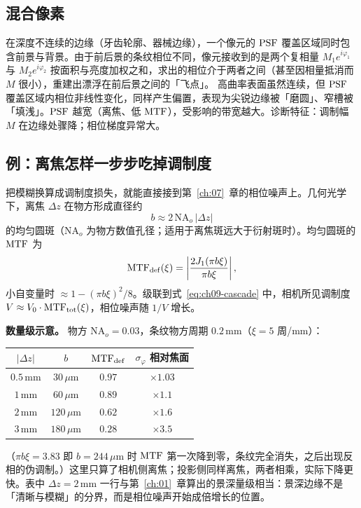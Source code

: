 \subsection{混合像素}

在深度不连续的边缘（牙齿轮廓、器械边缘），一个像元的 $\mathrm{PSF}$ 覆盖区域同时包含前景与背景。由于前后景的条纹相位不同，像元接收到的是两个复相量 $M_1e^{i\varphi_1}$ 与 $M_2e^{i\varphi_2}$ 按面积与亮度加权之和，求出的相位介于两者之间（甚至因相量抵消而 $M$ 很小），重建出漂浮在前后景之间的「飞点」。
高曲率表面虽然连续，但 $\mathrm{PSF}$ 覆盖区域内相位非线性变化，同样产生偏置，表现为尖锐边缘被「磨圆」、窄槽被「填浅」。$\mathrm{PSF}$ 越宽（离焦、低 $\mathrm{MTF}$），受影响的带宽越大。诊断特征：调制幅 $M$ 在边缘处骤降；相位梯度异常大。

\subsection{例：离焦怎样一步步吃掉调制度}

把模糊换算成调制度损失，就能直接接到第~\ref{ch:07}~章的相位噪声上。几何光学下，离焦 $\Delta z$ 在物方形成直径约
\[
  b\approx2\,\mathrm{NA}_o\,|\Delta z|
\]
的均匀圆斑（$\mathrm{NA}_o$ 为物方数值孔径；适用于离焦斑远大于衍射斑时）。均匀圆斑的 $\mathrm{MTF}$ 为
\[
  \mathrm{MTF}_{\mathrm{def}}(\xi)=\left|\frac{2J_1(\pi b\xi)}{\pi b\xi}\right|,
\]
小自变量时 $\approx1-(\pi b\xi)^2/8$。级联到式~\eqref{eq:ch09-cascade} 中，相机所见调制度 $V\approx V_0\cdot\mathrm{MTF}_{\mathrm{tot}}(\xi)$，相位噪声随 $1/V$ 增长。

\textbf{数量级示意。} 物方 $\mathrm{NA}_o=0.03$，条纹物方周期 $0.2\,\mathrm{mm}$（$\xi=5$ 周/mm）：
\begin{center}
\small
\begin{tabular}{cccc}
  \hline
  $|\Delta z|$ & $b$ & $\mathrm{MTF}_{\mathrm{def}}$ & $\sigma_\varphi$ 相对焦面\\
  \hline
  $0.5\,\mathrm{mm}$ & $30\,\mu\mathrm{m}$ & $0.97$ & $\times1.03$\\
  $1\,\mathrm{mm}$ & $60\,\mu\mathrm{m}$ & $0.89$ & $\times1.1$\\
  $2\,\mathrm{mm}$ & $120\,\mu\mathrm{m}$ & $0.62$ & $\times1.6$\\
  $3\,\mathrm{mm}$ & $180\,\mu\mathrm{m}$ & $0.28$ & $\times3.5$\\
  \hline
\end{tabular}
\end{center}
（$\pi b\xi=3.83$ 即 $b=244\,\mu\mathrm{m}$ 时 $\mathrm{MTF}$ 第一次降到零，条纹完全消失，之后出现反相的伪调制。）这里只算了相机侧离焦；投影侧同样离焦，两者相乘，实际下降更快。表中 $\Delta z=2\,\mathrm{mm}$ 一行与第~\ref{ch:01}~章算出的景深量级相当：景深边缘不是「清晰与模糊」的分界，而是相位噪声开始成倍增长的位置。

